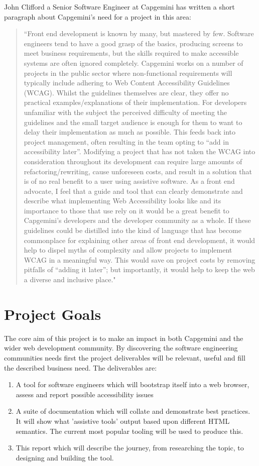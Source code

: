 John Clifford a Senior Software Engineer at Capgemini has written a short
paragraph about Capgemini's need for a project in this area:
\begin{quotation}
``Front end development is known by many, but mastered by few. Software
engineers tend to have a good grasp of the basics, producing screens to meet
business requirements, but the skills required to make accessible systems are
often ignored completely.
Capgemini works on a number of projects in the public sector where
non-functional requirements will typically include adhering to Web Content
Accessibility Guidelines (WCAG). Whilst the guidelines themselves are clear,
they offer no practical examples/explanations of their implementation. For
developers unfamiliar with the subject the perceived difficulty of meeting the
guidelines and the small target audience is enough for them to want to delay
their implementation as much as possible. This feeds back into project
management, often resulting in the team opting to “add in accessibility later”.
Modifying a project that has not taken the WCAG into consideration throughout
its development can require large amounts of refactoring/rewriting, cause
unforeseen costs, and result in a solution that is of no real benefit to a user
using assistive software.
As a front end advocate, I feel that a guide and tool that can clearly
demonstrate and describe what implementing Web Accessibility looks like and its
importance to those that use rely on it would be a great benefit to Capgemini’s
developers and the developer community as a whole. If these guidelines could
be distilled into the kind of language that has become commonplace for
explaining other areas of front end development, it would help to dispel
myths of complexity and allow projects to implement WCAG in a meaningful way.
This would save on project costs by removing pitfalls of “adding it later”; but
importantly, it would help to keep the web a diverse and inclusive place."
\end{quotation}

\section{Project Goals}
The core aim of this project is to make an impact in both Capgemini and the
wider web development community. By discovering the software
engineering communities needs first
the project deliverables will be relevant, useful and fill the described
business need. The deliverables are:
\begin{enumerate}
  \item A tool for software engineers which will bootstrap itself into a web
browser, assess and report possible accessibility issues
  \item A suite of documentation which will collate and demonstrate best
practices. It will show what 'assistive tools' output based upon different
HTML semantics. The current most popular tooling will be used to produce this.
  \item This report which will describe the journey, from researching the
topic, to designing and building the tool.
\end{enumerate}

